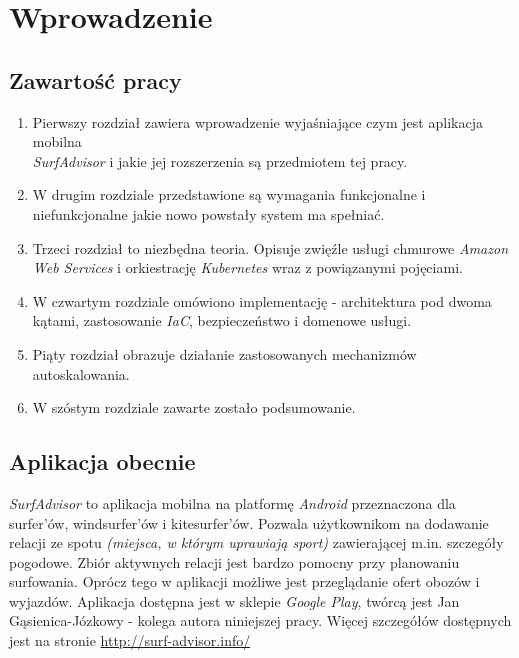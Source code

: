 \chapter{Wprowadzenie}
\label{cha:intro}

\section{Zawartość pracy}
\begin{enumerate}
    \item
    Pierwszy rozdział zawiera wprowadzenie wyjaśniające czym jest aplikacja mobilna\\ \emph{SurfAdvisor} i jakie jej rozszerzenia są przedmiotem tej pracy.

    \item
    W drugim rozdziale przedstawione są wymagania funkcjonalne i niefunkcjonalne jakie nowo powstały system ma spełniać.

    \item
    Trzeci rozdział to niezbędna teoria. Opisuje zwięźle usługi chmurowe \emph{Amazon Web Services} i orkiestrację \emph{Kubernetes} wraz z powiązanymi pojęciami.

    \item
    W czwartym rozdziale omówiono implementację - architektura pod dwoma kątami, zastosowanie \emph{IaC}, bezpieczeństwo i domenowe usługi.

    \item
    Piąty rozdział obrazuje działanie zastosowanych mechanizmów autoskalowania.

    \item
    W szóstym rozdziale zawarte zostało podsumowanie.
\end{enumerate} 


\section{Aplikacja obecnie}
\emph{SurfAdvisor} to aplikacja mobilna na platformę \emph{Android} przeznaczona dla surfer'ów, windsurfer'ów i kitesurfer'ów.
Pozwala użytkownikom na dodawanie relacji ze spotu \emph{(miejsca, w którym uprawiają sport)} zawierającej m.in. szczegóły pogodowe.
Zbiór aktywnych relacji jest bardzo pomocny przy planowaniu surfowania. Oprócz tego w aplikacji możliwe jest przeglądanie ofert obozów i wyjazdów.
Aplikacja dostępna jest w sklepie \emph{Google Play}, twórcą jest Jan Gąsienica-Józkowy - kolega autora niniejszej pracy.
Więcej szczegółów dostępnych jest na stronie \url{http://surf-advisor.info/}

